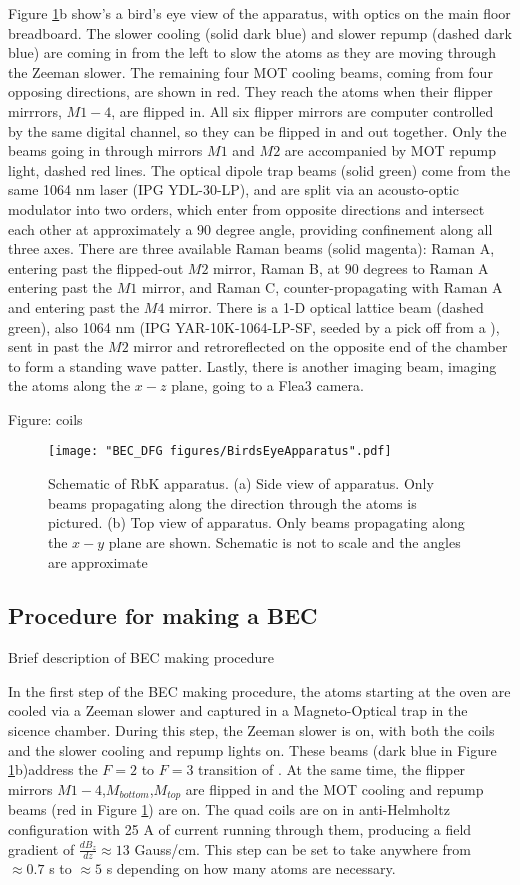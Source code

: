 Figure \ref{fig:BirdsEyeApparatus}b show's a bird's eye view of the apparatus, with optics on the main floor breadboard. The slower cooling (solid dark blue) and slower repump (dashed dark blue) are coming in from the left to slow the atoms as they are moving through the Zeeman slower. The remaining four MOT cooling beams, coming from four opposing directions, are shown in red.  They reach the atoms when their flipper mirrrors, $M1-4$, are flipped in. All six flipper mirrors are computer controlled by the same digital channel, so they can be flipped in and out together. Only the beams going in through mirrors $M1$ and $M2$ are accompanied by MOT repump light, dashed red lines. The optical dipole trap beams (solid green) come from the same 1064 nm laser (IPG YDL-30-LP), and are split via an acousto-optic modulator into two orders, which enter from opposite directions and intersect each other at approximately a $90$ degree angle, providing confinement along all three axes. There are three available Raman beams (solid magenta): Raman A, entering past the flipped-out $M2$ mirror, Raman B, at $90$ degrees to Raman A entering past the $M1$ mirror, and Raman C, counter-propagating with Raman A and entering past the $M4$ mirror. There is a 1-D optical lattice beam (dashed green), also 1064 nm (IPG YAR-10K-1064-LP-SF, seeded by a pick off from a ), sent in past the $M2$ mirror and retroreflected on the opposite end of the chamber to form a standing wave patter. Lastly, there is another imaging beam, imaging the atoms along the $x-z$ plane, going to a Flea3 camera. 

Figure: coils

\begin{figure}
	\texttt{[image: "BEC\_DFG figures/BirdsEyeApparatus".pdf]}
\caption{Schematic of RbK apparatus. (a) Side view of apparatus. Only beams propagating along the \ez{} direction through the atoms is pictured. (b) Top view of apparatus. Only beams propagating along the $x-y$ plane are shown. Schematic is not to scale and the angles are approximate}
\label{fig:BirdsEyeApparatus}
\end{figure}

\subsection{Procedure for making a BEC}
Brief description of BEC making procedure

In the first step of the BEC making procedure, the atoms starting at the oven are cooled via a Zeeman slower and captured in a Magneto-Optical trap in the sicence chamber. During this step, the Zeeman slower is on, with both the coils and the slower cooling and repump lights on. These beams (dark blue in Figure \ref{fig:BirdsEyeApparatus}b)address the $F=2$ to $F=3$ transition of \Rb{}. At the same time, the flipper mirrors $M1-4$,$M_{bottom}$,$M_{top}$ are flipped in and the MOT cooling and repump beams (red in Figure \ref{fig:BirdsEyeApparatus}) are on. The quad coils are on in anti-Helmholtz configuration with 25 A of current running through them, producing a field gradient of $\frac{dB_z}{dz}\approx13$ Gauss/cm. This step can be set to take anywhere from $\approx0.7$ s to $\approx5$ s depending on how many atoms are necessary.  

